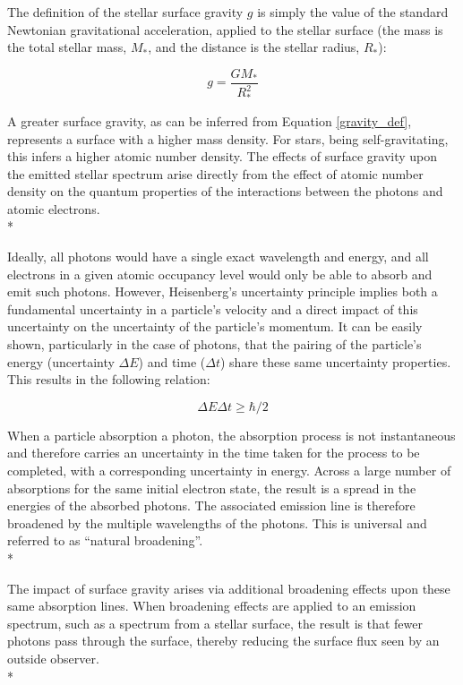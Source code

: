 \documentclass[12pt, a4paper]{report}
\begin{document}
The definition of the stellar surface gravity $g$ is simply the value of the standard Newtonian gravitational acceleration, applied to the stellar surface (the mass is the total stellar mass, $M_{*}$, and the distance is the stellar radius, $R_{*}$):

\begin{equation}
g = \frac{GM_{*}}{R_{*}^{2}}
\label{gravity_def}
\end{equation}

A greater surface gravity, as can be inferred from Equation \ref{gravity_def}, represents a surface with a higher mass density. For stars, being self-gravitating, this infers a higher atomic number density. The effects of surface gravity upon the emitted stellar spectrum arise directly from the effect of atomic number density on the quantum properties of the interactions between the photons and atomic electrons. \\*

Ideally, all photons would have a single exact wavelength and energy, and all electrons in a given atomic occupancy level would only be able to absorb and emit such photons. However, Heisenberg's uncertainty principle implies both a fundamental uncertainty in a particle's velocity and a direct impact of this uncertainty on the uncertainty of the particle's momentum. It can be easily shown, particularly in the case of photons, that the pairing of the particle's energy (uncertainty $\Delta E$) and time ($\Delta t$) share these same uncertainty properties. This results in the following relation:

\begin{equation}
\Delta E \Delta t \geq \hbar/2
\label{heisenberg}
\end{equation}

When a particle absorption a photon, the absorption process is not instantaneous and therefore carries an uncertainty in the time taken for the process to be completed, with a corresponding uncertainty in energy. Across a large number of absorptions for the same initial electron state, the result is a spread in the energies of the absorbed photons. The associated emission line is therefore broadened by the multiple wavelengths of the photons. This is universal and referred to as ``natural broadening''.\\*

The impact of surface gravity arises via additional broadening effects upon these same absorption lines. When broadening effects are applied to an emission spectrum, such as a spectrum from a stellar surface, the result is that fewer photons pass through the surface, thereby reducing the surface flux seen by an outside observer. \\*
\end{document}
